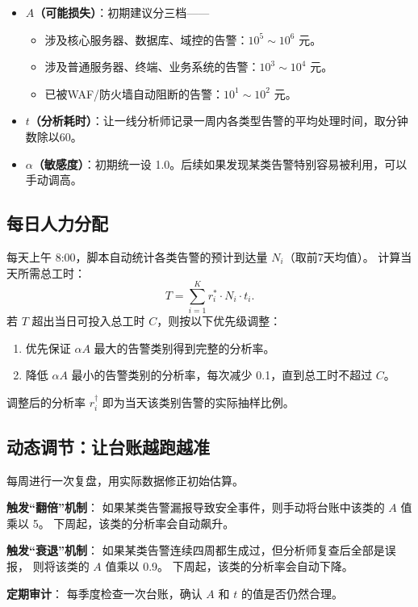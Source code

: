 \documentclass[11pt,a4paper]{article}
\begin{document}
\begin{itemize}
    \item \textbf{$A$（可能损失）}：初期建议分三档——
    \begin{itemize}
        \item 涉及核心服务器、数据库、域控的告警：$10^5 \sim 10^6$ 元。
        \item 涉及普通服务器、终端、业务系统的告警：$10^3 \sim 10^4$ 元。
        \item 已被WAF/防火墙自动阻断的告警：$10^1 \sim 10^2$ 元。
    \end{itemize}
    \item \textbf{$t$（分析耗时）}：让一线分析师记录一周内各类型告警的平均处理时间，取分钟数除以60。
    \item \textbf{$\alpha$（敏感度）}：初期统一设 1.0。后续如果发现某类告警特别容易被利用，可以手动调高。
\end{itemize}

\subsection{每日人力分配}

每天上午 8:00，脚本自动统计各类告警的预计到达量 $N_i$（取前7天均值）。
计算当天所需总工时：
\[
T = \sum_{i=1}^{K} r_i^* \cdot N_i \cdot t_i.
\]
若 $T$ 超出当日可投入总工时 $C$，则按以下优先级调整：
\begin{enumerate}
    \item 优先保证 $\alpha A$ 最大的告警类别得到完整的分析率。
    \item 降低 $\alpha A$ 最小的告警类别的分析率，每次减少 0.1，直到总工时不超过 $C$。
\end{enumerate}
调整后的分析率 $r_i^\dagger$ 即为当天该类别告警的实际抽样比例。

\subsection{动态调节：让台账越跑越准}

每周进行一次复盘，用实际数据修正初始估算。

\textbf{触发“翻倍”机制}：
如果某类告警漏报导致安全事件，则手动将台账中该类的 $A$ 值乘以 5。
下周起，该类的分析率会自动飙升。

\textbf{触发“衰退”机制}：
如果某类告警连续四周都生成过，但分析师复查后全部是误报，
则将该类的 $A$ 值乘以 0.9。
下周起，该类的分析率会自动下降。

\textbf{定期审计}：
每季度检查一次台账，确认 $A$ 和 $t$ 的值是否仍然合理。
\end{document}

